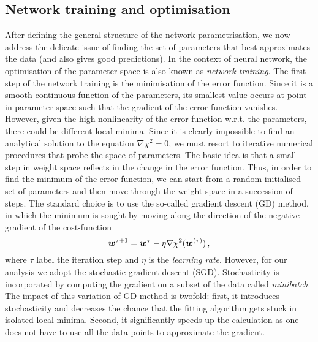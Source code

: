 \subsection{Network training and optimisation}
\label{sec:NNtr}
After defining the general structure of the network parametrisation, we now address the delicate issue of finding the set of parameters that best approximates the data (and also gives good predictions). In the context of neural network, the optimisation of the parameter space is also known as \textit{network training}. The first step of the network training is the minimisation of the error function. Since it is a smooth continuous function of the parameters, its smallest value occurs at point in parameter space such that the gradient of the error function vanishes. However, given the high nonlinearity of the error function w.r.t. the parameters, there could be different local minima. Since it is clearly impossible to find an analytical solution to the equation $\nabla \chi^2 = 0$, we must resort to iterative numerical procedures that probe the space of parameters. The basic idea is that a small step in weight space reflects in the change in the error function. Thus, in order to find the minimum of the error function, we can start from a random initialised set of parameters and then move through the weight space in a succession of steps. The standard choice is to use the so-called gradient descent (GD) method, in which the minimum is sought by moving along the direction of the negative gradient of the cost-function
\begin{equation}
  \vb*{w}^{\tau + 1} = \vb*{w}^{\tau} - \eta \nabla \chi^2 (\vb*{w}^{(\tau)}) \,,
  \label{eq:GD}
\end{equation}
where $\tau$ label the iteration step and $\eta$ is the \textit{learning rate}. However, for our analysis we adopt the stochastic gradient descent (SGD). Stochasticity is incorporated by computing the gradient on a subset of the data called \textit{minibatch}. The impact of this variation of GD method is twofold: first, it introduces stochasticity and decreases the chance that the fitting algorithm gets stuck in isolated local minima. Second, it significantly speeds up the calculation as one does not have to use all the data points to approximate the gradient.\par
